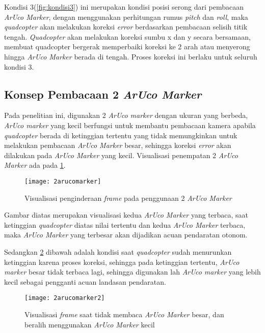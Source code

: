 Kondisi 3(\cref{fig:kondisi3}) ini merupakan kondisi posisi serong dari pembacaan \textit{ArUco Marker}, dengan menggunakan perhitungan rumus \textit{pitch} dan \textit{roll}, maka \textit{quadcopter} akan melakukan koreksi \textit{error} berdasarkan pembacaan selisih titik tengah. \textit{Quadcopter} akan melakukan koreksi sumbu x dan y secara bersamaan, membuat quadcopter bergerak memperbaiki koreksi ke 2 arah atau menyerong hingga \textit{ArUco Marker} berada di tengah. Proses koreksi ini berlaku untuk seluruh kondisi 3.

\subsection{Konsep Pembacaan 2 \textit{ArUco Marker}}
Pada penelitian ini, digunakan 2 \textit{ArUco marker} dengan ukuran yang berbeda, \textit{ArUco marker} yang kecil berfungsi untuk membantu pembacaan kamera apabila \textit{quadcopter} berada di ketinggian tertentu yang tidak memungkinkan untuk melakukan pembacaan \textit{ArUco Marker} besar, sehingga koreksi \textit{error} akan dilakukan pada \textit{ArUco Marker} yang kecil. Visualisasi penempatan 2 \textit{ArUco Marker} ada pada \cref{fig:2arucomarker}.

\begin{figure}[H]
	\centering
	\texttt{[image: 2arucomarker]}
	\caption{Visualisasi penginderaan \textit{frame} pada penggunaan 2 \textit{ArUco Marker}}
	\label{fig:2arucomarker}
\end{figure}

Gambar diatas merupakan visualisasi kedua \textit{ArUco Marker} yang terbaca, saat ketinggian \textit{quadcopter} diatas nilai tertentu dan kedua \textit{ArUco Marker} terbaca, maka \textit{ArUco Marker} yang terbesar akan dijadikan acuan pendaratan otonom.

Sedangkan \cref{fig:2arucomarker2} dibawah adalah kondisi saat \textit{quadcopter} sudah menurunkan ketinggian karena proses koreksi, sehingga pada ketinggian tertentu, \textit{ArUco marker} besar tidak terbaca lagi, sehingga digunakan lah \textit{ArUco marker} yang lebih kecil sebagai pengganti acuan landasan pendaratan.

\begin{figure}[H]
	\centering
	\texttt{[image: 2arucomarker2]}
	\caption{Visualisasi \textit{frame} saat tidak membaca \textit{ArUco Marker} besar, dan beralih menggunakan \textit{ArUco Marker} kecil}
	\label{fig:2arucomarker2}
\end{figure}

